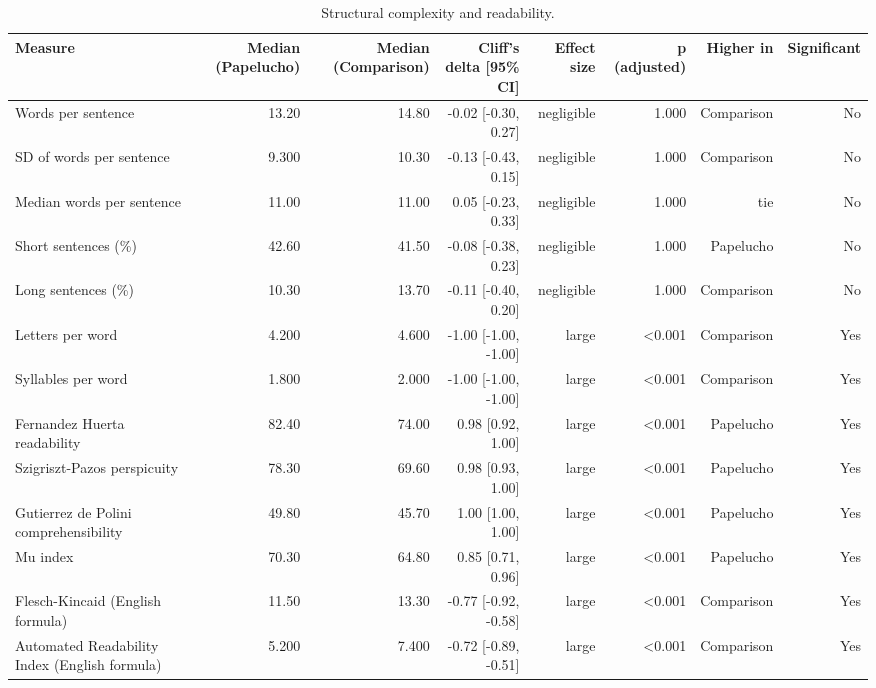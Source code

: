 \begin{table}[htbp]
\centering
\small
\caption{Structural complexity and readability.}
\label{tab:readability-results}
\begin{tabular}{lrrrrrrr}
\toprule
\textbf{Measure} & \textbf{Median (Papelucho)} & \textbf{Median (Comparison)} & \textbf{Cliff's delta [95\% CI]} & \textbf{Effect size} & \textbf{p (adjusted)} & \textbf{Higher in} & \textbf{Significant} \\
\midrule
Words per sentence & 13.20 & 14.80 & -0.02 [-0.30, 0.27] & negligible & 1.000 & Comparison & No \\
SD of words per sentence & 9.300 & 10.30 & -0.13 [-0.43, 0.15] & negligible & 1.000 & Comparison & No \\
Median words per sentence & 11.00 & 11.00 & 0.05 [-0.23, 0.33] & negligible & 1.000 & tie & No \\
Short sentences (\%) & 42.60 & 41.50 & -0.08 [-0.38, 0.23] & negligible & 1.000 & Papelucho & No \\
Long sentences (\%) & 10.30 & 13.70 & -0.11 [-0.40, 0.20] & negligible & 1.000 & Comparison & No \\
Letters per word & 4.200 & 4.600 & -1.00 [-1.00, -1.00] & large & <0.001 & Comparison & Yes \\
Syllables per word & 1.800 & 2.000 & -1.00 [-1.00, -1.00] & large & <0.001 & Comparison & Yes \\
Fernandez Huerta readability & 82.40 & 74.00 & 0.98 [0.92, 1.00] & large & <0.001 & Papelucho & Yes \\
Szigriszt-Pazos perspicuity & 78.30 & 69.60 & 0.98 [0.93, 1.00] & large & <0.001 & Papelucho & Yes \\
Gutierrez de Polini comprehensibility & 49.80 & 45.70 & 1.00 [1.00, 1.00] & large & <0.001 & Papelucho & Yes \\
Mu index & 70.30 & 64.80 & 0.85 [0.71, 0.96] & large & <0.001 & Papelucho & Yes \\
Flesch-Kincaid (English formula) & 11.50 & 13.30 & -0.77 [-0.92, -0.58] & large & <0.001 & Comparison & Yes \\
Automated Readability Index (English formula) & 5.200 & 7.400 & -0.72 [-0.89, -0.51] & large & <0.001 & Comparison & Yes \\
\bottomrule
\end{tabular}
\end{table}

